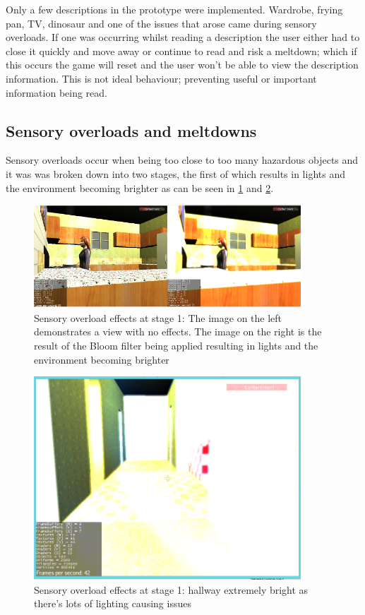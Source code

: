 \documentclass[11pt]{report}
\begin{document}
Only a few descriptions in the prototype were implemented. Wardrobe, frying pan, TV, dinosaur and one of the issues that arose came during sensory overloads. If one was occurring whilst reading a description the user either had to close it quickly and move away or continue to read and risk a meltdown; which if this occurs the game will reset and the user won't be able to view the description information. This is not ideal behaviour; preventing useful or important information being read.

\subsection*{Sensory overloads and meltdowns}

Sensory overloads occur when being too close to too many hazardous objects and it was was broken down into two stages, the first of which results in lights and the environment becoming brighter as can be seen in \ref{prototype_so1s1} and \ref{prototype_so2s1}. 

\begin{figure}[H]
\centering
\includegraphics[width=100mm]{images/prototype/old_sensoryeffects.png}
\caption{Sensory overload effects at stage 1: The image on the left demonstrates a view with no effects. The image on the right is the result of the Bloom filter being applied resulting in lights and the environment becoming brighter}
\label{prototype_so1s1}
\end{figure}

\begin{figure}[H]
\centering
\includegraphics[width=100mm]{images/prototype/hallway_so1.png}
\caption{Sensory overload effects at stage 1: hallway extremely bright as there's lots of lighting causing issues}
\label{prototype_so2s1}
\end{figure}
\end{document}
